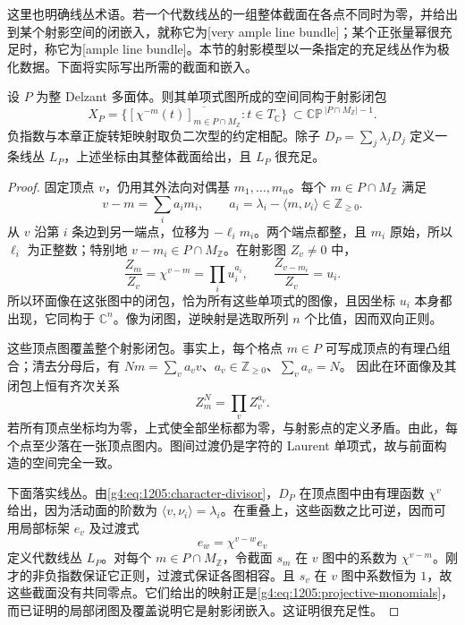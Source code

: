\ProseParagraphBreak

这里也明确线丛术语。若一个代数线丛的一组整体截面在各点不同时为零，并给出到某个射影空间的闭嵌入，就称它为[very ample line bundle]；某个正张量幂很充足时，称它为[ample line bundle]。本节的射影模型以一条指定的充足线丛作为极化数据。下面将实际写出所需的截面和嵌入。

\begin{proposition}\label{g4:prop:1205:integral-embedding}
	设 \(P\) 为整 Delzant 多面体。则其单项式图所成的空间同构于射影闭包
	\begin{equation}\label{g4:eq:1205:projective-monomials}
		X_P=\overline{\{[\chi^{-m}(t)]_{m\in P\cap M_{\mathbb Z}}:
		t\in T_{\mathbb C}\}}\ \subset
		\mathbb{CP}^{\,|P\cap M_{\mathbb Z}|-1}.
	\end{equation}
	负指数与本章正旋转矩映射取负二次型的约定相配。除子
	\(D_P=\sum_j\lambda_jD_j\) 定义一条线丛 \(L_P\)，上述坐标由其整体截面给出，且 \(L_P\) 很充足。
\end{proposition}
\begin{proof}
	固定顶点 \(v\)，仍用其外法向对偶基 \(m_1,\ldots,m_n\)。每个 \(m\in P\cap M_{\mathbb Z}\) 满足
	\[
		v-m=\sum_i a_i m_i,\qquad
		a_i=\lambda_i-\langle m,\nu_i\rangle\in\mathbb Z_{\ge0}.
	\]
	从 \(v\) 沿第 \(i\) 条边到另一端点，位移为 \(-\ell_i m_i\)。两个端点都整，且 \(m_i\) 原始，所以 \(\ell_i\) 为正整数；特别地 \(v-m_i\in P\cap M_{\mathbb Z}\)。在射影图 \(Z_v\ne0\) 中，
	\[
		\frac{Z_m}{Z_v}=\chi^{v-m}
		=\prod_i u_i^{a_i},
		\qquad
		\frac{Z_{v-m_i}}{Z_v}=u_i.
	\]
	所以环面像在这张图中的闭包，恰为所有这些单项式的图像，且因坐标 \(u_i\) 本身都出现，它同构于 \(\mathbb C^n\)。像为闭图，逆映射是选取所列 \(n\) 个比值，因而双向正则。

	这些顶点图覆盖整个射影闭包。事实上，每个格点 \(m\in P\) 可写成顶点的有理凸组合；清去分母后，有
	\(Nm=\sum_v a_vv\)、\(a_v\in\mathbb Z_{\ge0}\)、\(\sum_v a_v=N\)。
	因此在环面像及其闭包上恒有齐次关系
	\[
		Z_m^N=\prod_v Z_v^{a_v}.
	\]
	若所有顶点坐标均为零，上式使全部坐标都为零，与射影点的定义矛盾。由此，每个点至少落在一张顶点图内。图间过渡仍是字符的 Laurent 单项式，故与前面构造的空间完全一致。

	下面落实线丛。由\eqref{g4:eq:1205:character-divisor}，\(D_P\) 在顶点图中由有理函数 \(\chi^v\) 给出，因为活动面的阶数为 \(\langle v,\nu_i\rangle=\lambda_i\)。在重叠上，这些函数之比可逆，因而可用局部标架 \(e_v\) 及过渡式
	\[
		e_w=\chi^{v-w}e_v
	\]
	定义代数线丛 \(L_P\)。对每个 \(m\in P\cap M_{\mathbb Z}\)，令截面 \(s_m\) 在 \(v\) 图中的系数为 \(\chi^{v-m}\)。刚才的非负指数保证它正则，过渡式保证各图相容。且 \(s_v\) 在 \(v\) 图中系数恒为 \(1\)，故这些截面没有共同零点。它们给出的映射正是\eqref{g4:eq:1205:projective-monomials}，而已证明的局部闭图及覆盖说明它是射影闭嵌入。这证明很充足性。
\end{proof}

